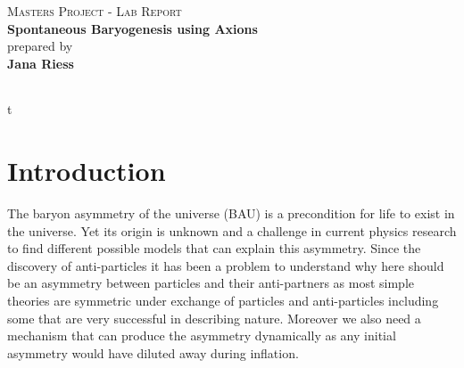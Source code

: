 \documentclass[13pt,a4paper,titlepage]{article}
\begin{document}
\begin{titlepage}

\vspace*{3cm}

\centering
\textsc{\Large Masters Project - Lab Report}
\\
\vspace*{1cm}
{\Large \bfseries
Spontaneous Baryogenesis using Axions
\\[0.1cm]}
\vspace*{1cm}
{
\centering\Large
prepared by\\[0.2cm]
{\bfseries Jana Riess}\\[0.2cm]
}

\vspace*{2cm}

\begin{Large}
\begin{tabular}{ll}
\end{tabular}
\end{Large}

\vspace*{1.5cm}

\end{titlepage}

\tableofcontents
\newpage

\newcommand{\jana}[1]{{\color{magenta}{#1}}}t


\section{Introduction}
\label{sec:introduction}

\noindent
The baryon asymmetry of the universe (BAU) is a precondition for life to exist in the universe.
Yet its origin is unknown and a challenge in current physics research to find different possible models
that can explain this asymmetry.
Since the discovery of anti-particles it has been a problem to understand why here should be
an asymmetry between particles and their anti-partners as most simple theories are symmetric under
exchange of particles and anti-particles including some that are
very successful in describing nature. Moreover we also need a mechanism that can
produce the asymmetry dynamically as any initial asymmetry would have diluted away during inflation.
\end{document}
